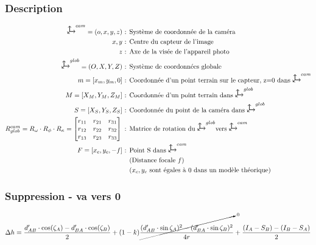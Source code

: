 \subsubsection{Description}
\begin{align*}
    \descrVarEq{\scu^{cam}=(o,x,y,z)}{Système de coordonnée de la caméra}\\
    \descrVarEq{x,y}{Centre du capteur de l'image}\\
    \descrVarEq{z}{Axe de la visée de l'appareil photo}\\
    \descrVarEq{\scu^{glob}=(O,X,Y,Z)}{Système de coordonnées globale}\\
    \descrVarEq{m=[x_m,y_m,0]}{Coordonnée d'un point terrain sur le capteur, z=0 dans $\scu^{cam}$}\\
    \descrVarEq{M=[X_M,Y_M,Z_M]}{Coordonnée d'un point terrain dans $\scu^{glob}$}\\
    \descrVarEq{S=[X_S,Y_S,Z_S]}{Coordonnée du point de la caméra dans $\scu^{glob}$}\\
    R_{glob}^{cam}=R_\omega\cdot R_\phi\cdot R_\kappa=\begin{bmatrix}
    r_{11}&r_{21}&r_{31}\\
    r_{12}&r_{22}&r_{32}\\
    r_{13}&r_{23}&r_{33}
    \end{bmatrix}\textrm{ : }&\textrm{Matrice de rotation du $\scu^{glob}$vers $\scu^{cam}$}\\
    \descrVarEq{F=[x_c,y_c,-f]}{Point S dans $\scu^{cam}$}\\
    &\textrm{(Distance focale $f$)}\\
    &\textrm{($x_c,y_c$ sont égales à 0 dans un modèle théorique)}\\
\end{align*}
\subsubsection{Suppression - va vers 0}
$$ \Delta h = \frac{d'_{AB} \cdot \cos(\zeta_A) - d'_{BA} \cdot \cos(\zeta_B)}{2} + (1-k) \frac{\cancelto{0}{(d'_{AB} \cdot\sin \zeta_A)^2 - (d'_{BA} \cdot\sin \zeta_B)^2}}{4r} + \frac{(I_A - S_B) - (I_B - S_A)}{2} $$


